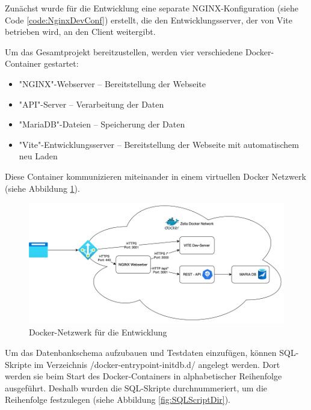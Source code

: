 \label{sec:dockerDevImpl}

Zunächst wurde für die Entwicklung eine separate NGINX-Konfiguration (siehe Code \ref{code:NginxDevConf}) erstellt, die den Entwicklungsserver, der von Vite betrieben wird, an den Client weitergibt.


Um das Gesamtprojekt bereitzustellen, werden vier verschiedene Docker-Container gestartet:

\begin{itemize}
    \item "NGINX"-Webserver -- Bereitstellung der Webseite
    \item "API"-Server -- Verarbeitung der Daten
    \item "MariaDB"-Dateien -- Speicherung der Daten
    \item "Vite"-Entwicklungsserver -- Bereitstellung der Webseite mit automatischem neu Laden
\end{itemize}

Diese Container kommunizieren miteinander in einem virtuellen Docker Netzwerk (siehe Abbildung \ref{fig:DockerDevNetwork}). 

\begin{figure}[H]
    \centering
    \includegraphics[width=\textwidth]{media/Docker/DevNetwork.png}
    \caption{Docker-Netzwerk für die Entwicklung}
    \label{fig:DockerDevNetwork}
\end{figure}

Um das Datenbankschema aufzubauen und Testdaten einzufügen, können SQL-Skripte im Verzeichnis {\ttfamily /docker-entrypoint-initdb.d/} angelegt werden. Dort werden sie beim Start des Docker-Containers in alphabetischer Reihenfolge ausgeführt. Deshalb wurden die SQL-Skripte durchnummeriert, um die Reihenfolge festzulegen (siehe Abbildung \ref{fig:SQLScriptDir}).

